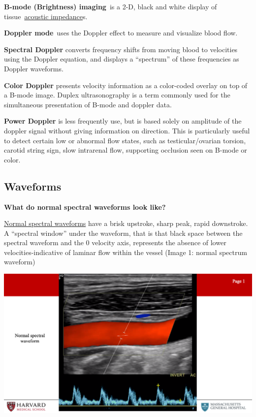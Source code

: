 \documentclass[
]{book}
\begin{document}
\textbf{B-mode (Brightness) imaging}~is a 2-D, black and white display of
tissue~\href{https://en.wikipedia.org/wiki/Acoustic_impedance}{acoustic
impedance}s.

\textbf{Doppler mode}~uses the Doppler effect to measure and visualize blood
flow.

\textbf{Spectral Doppler} converts frequency shifts from moving blood to
velocities using the Doppler equation, and displays a ``spectrum'' of
these frequencies as Doppler waveforms.

\textbf{Color Doppler} presents velocity information as a color-coded overlay
on top of a B-mode image. Duplex ultrasonography is a term commonly used
for the simultaneous presentation of B-mode and doppler data.

\textbf{Power Doppler} is less frequently use, but is based solely on
amplitude of the doppler signal without giving information on direction.
This is particularly useful to detect certain low or abnormal flow
states, such as testicular/ovarian torsion, carotid string sign, slow
intrarenal flow, supporting occlusion seen on B-mode or
color.\citep{pellerito2019}

\hypertarget{waveforms}{%
\subsection{Waveforms}\label{waveforms}}

\textbf{What do normal spectral waveforms look like?}

\uline{Normal spectral waveforms} have a brisk upstroke, sharp
peak, rapid downstroke. A ``spectral window'' under the waveform, that is
that black space between the spectral waveform and the 0 velocity axis,
represents the absence of lower velocities-indicative of laminar flow
within the vessel (Image 1: normal spectrum waveform)

\includegraphics[width=15.01in]{images/vasc_lab2/Slide2}
\end{document}
